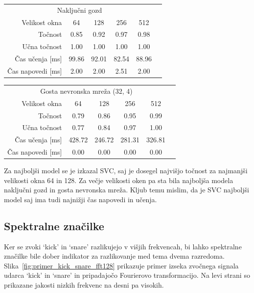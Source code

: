 \documentclass[11pt,a4paper]{article}
\begin{document}
\begin{center}
\begin{tabular}{r | c c c c c}
    \multicolumn{5}{c}{Naključni gozd}\\
    \tiny{Velikost okna} & \small{64} & \small{128} & \small{256} & \small{512}\\ \hline
    \tiny{Točnost} & \small{0.85} & \small{0.92} & \small{0.97} & \small{0.98}\\
    \tiny{Učna točnost} & \small{1.00} & \small{1.00} & \small{1.00} & \small{1.00}\\
    \tiny{Čas učenja [ms]} & \small{99.86} & \small{92.01} & \small{82.54} & \small{88.96}\\
    \tiny{Čas napovedi [ms]} & \small{2.00} & \small{2.00} & \small{2.51} & \small{2.00}\\
    \end{tabular}

\begin{tabular}{r | c c c c c}
    \multicolumn{5}{c}{Gosta nevronska mreža (32, 4)}\\
    \tiny{Velikost okna} & \small{64} & \small{128} & \small{256} & \small{512}\\ \hline
    \tiny{Točnost} & \small{0.79} & \small{0.86} & \small{0.95} & \small{0.99}\\
    \tiny{Učna točnost} & \small{0.77} & \small{0.84} & \small{0.97} & \small{1.00}\\
    \tiny{Čas učenja [ms]} & \small{428.72} & \small{246.72} & \small{281.31} & \small{326.81}\\
    \tiny{Čas napovedi [ms]} & \small{0.00} & \small{0.00} & \small{0.00} & \small{0.00}\\
    \end{tabular}
\end{center}

Za najboljši model se je izkazal SVC, saj je dosegel najvišjo točnost za najmanjši velikosti okna 64 in 128. Za večje velikosti oken pa sta bila najboljša modela naključni gozd in gosta nevronska mreža. Kljub temu mislim, da je SVC najboljši model saj ima tudi najnižji čas napovedi in učenja.



\subsection{Spektralne značilke}
Ker se zvoki `kick' in `snare' razlikujejo v višjih frekvencah, bi lahko spektralne značilke bile dober indikator za razlikovanje med tema dvema razredoma. Slika~\ref{fig:primer_kick_snare_fft128} prikazuje primer izseka zvočnega signala udarca `kick' in `snare' in pripadajočo Fourierovo transformacijo. Na levi strani so prikazane jakosti nizkih frekvenc na desni pa visokih. 
\end{document}
